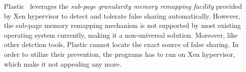 Plastic~\cite{OSdetection} leverages the {\it sub-page granularity memory remapping facility}
provided by Xen hypervisor to detect and tolerate false sharing automatically.
However, the sub-page memory remapping mechanism is not supported by most existing operating 
system currently, making it a non-universal solution. Moreover, like other
detction tools, Plastic cannot locate the exact source of false sharing.  
In order to utilize their prevention, the programs has to run on Xen hypervisor, 
which make it not appealing any more.

